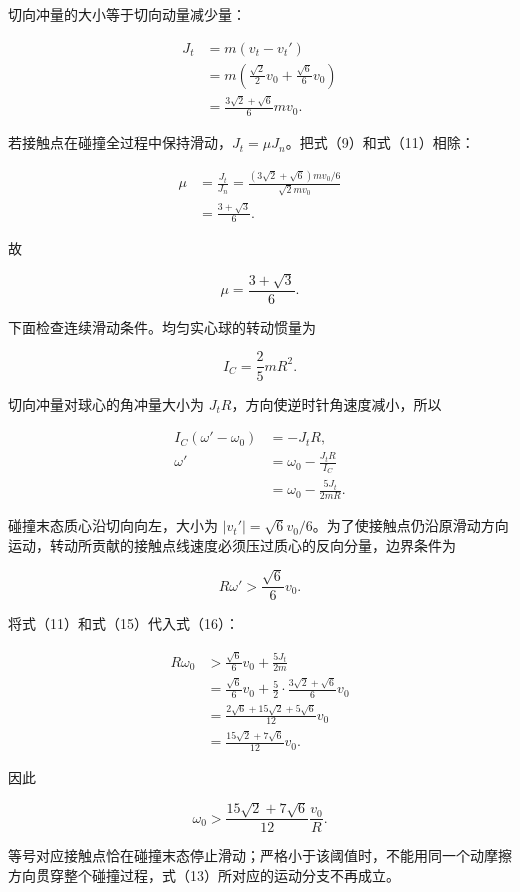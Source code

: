 \documentclass[12pt,a4paper,UTF8]{ctexart}
\begin{document}
切向冲量的大小等于切向动量减少量：

\[
\begin{aligned}
J_t
&=m(v_t-v_t')\\
&=m\left(\frac{\sqrt2}{2}v_0+\frac{\sqrt6}{6}v_0\right)\\
&=\frac{3\sqrt2+\sqrt6}{6}mv_0. 
\end{aligned}
\tag{11}
\]

若接触点在碰撞全过程中保持滑动，\(J_t=\mu J_n\)。把式（9）和式（11）相除：

\[
\begin{aligned}
\mu
&=\frac{J_t}{J_n}
=\frac{(3\sqrt2+\sqrt6)mv_0/6}{\sqrt2mv_0}\\
&=\frac{3+\sqrt3}{6}. 
\end{aligned}
\tag{12}
\]

故

\[
\boxed{\mu=\frac{3+\sqrt3}{6}}. \tag{13}
\]

下面检查连续滑动条件。均匀实心球的转动惯量为

\[
I_C=\frac25mR^2. \tag{14}
\]

切向冲量对球心的角冲量大小为 \(J_tR\)，方向使逆时针角速度减小，所以

\[
\begin{aligned}
I_C(\omega'-\omega_0)&=-J_tR,\\
\omega'&=\omega_0-\frac{J_tR}{I_C}\\
&=\omega_0-\frac{5J_t}{2mR}. 
\end{aligned}
\tag{15}
\]

碰撞末态质心沿切向向左，大小为
\(|v_t'|=\sqrt6v_0/6\)。为了使接触点仍沿原滑动方向运动，转动所贡献的接触点线速度必须压过质心的反向分量，边界条件为

\[
R\omega'>\frac{\sqrt6}{6}v_0. \tag{16}
\]

将式（11）和式（15）代入式（16）：

\[
\begin{aligned}
R\omega_0
&>\frac{\sqrt6}{6}v_0+\frac{5J_t}{2m}\\
&=\frac{\sqrt6}{6}v_0
+\frac52\cdot\frac{3\sqrt2+\sqrt6}{6}v_0\\
&=\frac{2\sqrt6+15\sqrt2+5\sqrt6}{12}v_0\\
&=\frac{15\sqrt2+7\sqrt6}{12}v_0. 
\end{aligned}
\tag{17}
\]

因此

\[
\boxed{\omega_0>
\frac{15\sqrt2+7\sqrt6}{12}\frac{v_0}{R}}. \tag{18}
\]

等号对应接触点恰在碰撞末态停止滑动；严格小于该阈值时，不能用同一个动摩擦方向贯穿整个碰撞过程，式（13）所对应的运动分支不再成立。
\end{document}
